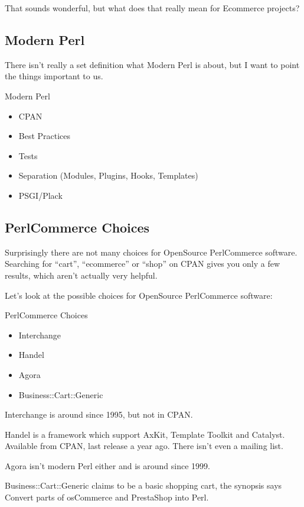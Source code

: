 That sounds wonderful, but what does that really mean for Ecommerce
projects?

\subsection{Modern Perl}
There isn't really a set definition what Modern Perl is about,
but I want to point the things important to us.

\begin{frame}{Modern Perl}
\begin{itemize}
\item CPAN
\item Best Practices
\item Tests
\item Separation (Modules, Plugins, Hooks, Templates)
\item PSGI/Plack
\end{itemize}
\end{frame}

\subsection{PerlCommerce Choices}
Surprisingly there are not many choices for OpenSource PerlCommerce
software. Searching for ``cart'', ``ecommerce'' or ``shop'' on CPAN
gives you only a few results, which aren't actually very helpful.

Let's look at the possible choices for OpenSource PerlCommerce software:

\begin{frame}{PerlCommerce Choices}
\begin{itemize}
\item Interchange
\item Handel
\item Agora
\item Business::Cart::Generic
\end{itemize}
\end{frame}

Interchange is around since 1995, but not in CPAN.

Handel is a framework which support AxKit, Template Toolkit 
and Catalyst.
Available from CPAN, last release a year ago.
There isn't even a mailing list.

Agora isn't modern Perl either and is around since 1999.

Business::Cart::Generic claims to be a basic shopping cart,
the synopsis says Convert parts of osCommerce and PrestaShop into
Perl.

